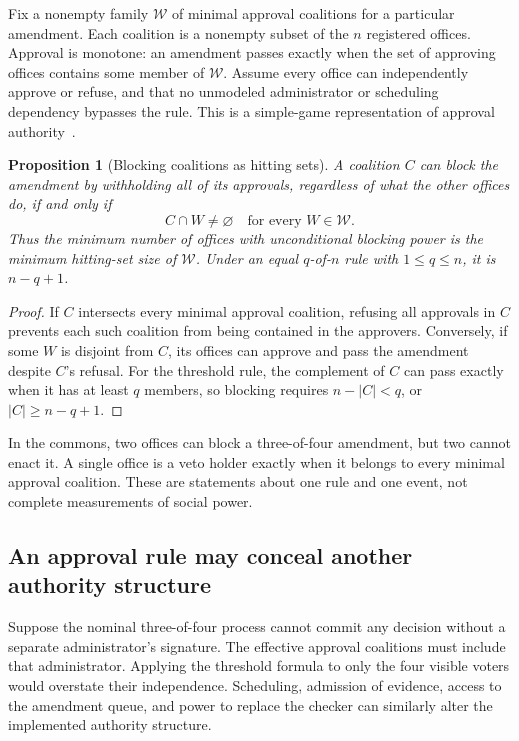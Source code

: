\documentclass[11pt,letterpaper]{article}
\theoremstyle{plain}
\newtheorem{proposition}{Proposition}[section]
\theoremstyle{definition}
\theoremstyle{remark}
\begin{document}
Fix a nonempty family $\mathcal W$ of minimal approval coalitions for a particular amendment. Each coalition is a nonempty subset of the $n$ registered offices. Approval is monotone: an amendment passes exactly when the set of approving offices contains some member of $\mathcal W$. Assume every office can independently approve or refuse, and that no unmodeled administrator or scheduling dependency bypasses the rule. This is a simple-game representation of approval authority~\cite{taylorzwicker}.

\begin{proposition}[Blocking coalitions as hitting sets]\label{prop:blocker}
A coalition $C$ can block the amendment by withholding all of its approvals, regardless of what the other offices do, if and only if
\[
C\cap W\ne\varnothing\quad\text{for every }W\in\mathcal W.
\]
Thus the minimum number of offices with unconditional blocking power is the minimum hitting-set size of $\mathcal W$. Under an equal $q$-of-$n$ rule with $1\leq q\leq n$, it is $n-q+1$.
\end{proposition}
\begin{proof}
If $C$ intersects every minimal approval coalition, refusing all approvals in $C$ prevents each such coalition from being contained in the approvers. Conversely, if some $W$ is disjoint from $C$, its offices can approve and pass the amendment despite $C$'s refusal. For the threshold rule, the complement of $C$ can pass exactly when it has at least $q$ members, so blocking requires $n-|C|<q$, or $|C|\geq n-q+1$.
\end{proof}

In the commons, two offices can block a three-of-four amendment, but two cannot enact it. A single office is a veto holder exactly when it belongs to every minimal approval coalition. These are statements about one rule and one event, not complete measurements of social power.

\subsection{An approval rule may conceal another authority structure}
Suppose the nominal three-of-four process cannot commit any decision without a separate administrator's signature. The effective approval coalitions must include that administrator. Applying the threshold formula to only the four visible voters would overstate their independence. Scheduling, admission of evidence, access to the amendment queue, and power to replace the checker can similarly alter the implemented authority structure.
\end{document}
